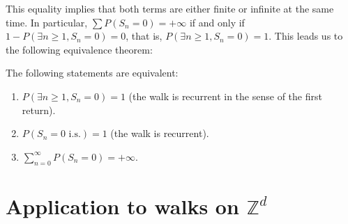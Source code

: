 This equality implies that both terms are either finite or infinite at the same time. In particular, $\sum P(S_n=0) = +\infty$ if and only if $1 - P(\exists n \ge 1, S_n=0) = 0$, that is, $P(\exists n \ge 1, S_n=0) = 1$.
This leads us to the following equivalence theorem:%
\begin{theorem}
The following statements are equivalent:
\begin{enumerate}
    \item $P(\exists n \ge 1, S_n=0) = 1$ (the walk is recurrent in the sense of the first return).
    \item $P(S_n=0 \text{ i.s.}) = 1$ (the walk is recurrent).
    \item $\sum_{n=0}^{\infty} P(S_n=0) = +\infty$.
\end{enumerate}
\end{theorem}%
\section{Application to walks on $\mathbb{Z}^d$}%
